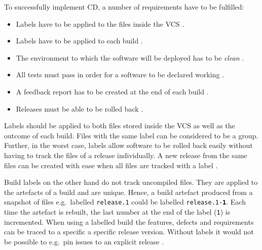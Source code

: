 To successfully implement \ac{CD}, a number of requirements have to be
fulfilled: 
\begin{itemize}
  \item Labels have to be applied to the files inside the \ac{VCS}
    \autocite[pp. 191-194]{MatyasContinuousIntegration2007}.
  \item Labels have to be applied to each build \autocite[pp.
    195f.]{MatyasContinuousIntegration2007}.
  \item The environment to which the software will be deployed has to be
    \textit{clean} \autocite[pp. 194f.]{MatyasContinuousIntegration2007}.
  \item All tests must pass in order for a software to be declared working
    \autocite[p. 196]{MatyasContinuousIntegration2007}.
  \item A feedback report has to be created at the end of each build
    \autocite[pp. 196-198]{MatyasContinuousIntegration2007}.
  \item Releases must be able to be rolled back \autocite[p.
    199]{MatyasContinuousIntegration2007}.
\end{itemize}

Labels should be applied to both files stored inside the \ac{VCS} as well as
the outcome of each build. Files with the same label can be considered to be a
group. Further, in the worst case, labels allow software to be rolled back
easily without having to track the files of a release individually. A new
release from the same files can be created with ease when all files are tracked
with a label \autocite[pp. 191-194]{MatyasContinuousIntegration2007}.

Build labels on the other hand do not track uncompiled files. They are applied
to the artefacts of a build and are unique. Hence, a build artefact produced
from a snapshot of files e.g.\ labelled \texttt{release.1}
could be labelled \texttt{release.1-\textbf{1}}. Each time
the artefact is rebuilt, the last number at the end of the label (\texttt{1})
is incremented. When using a labelled build the features, defects and
requirements can be traced to a specific a specific release version. Without
labels it would not be possible to e.g.\ pin issues to an explicit release
\autocite[pp. 195f.]{MatyasContinuousIntegration2007}.

